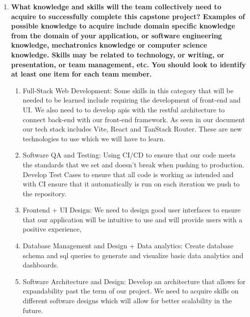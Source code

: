 \begin{enumerate}
  \item \textbf{What knowledge and skills will the team collectively need to acquire to successfully complete this capstone project?  Examples of possible knowledge to acquire include domain specific knowledge from the domain of your application, or software engineering knowledge, mechatronics knowledge or computer science knowledge.  Skills may be related to technology, or writing, or presentation, or team management, etc. You should look to identify at least one item for each team member.} \\
  \begin{enumerate}
    \item Full-Stack Web Development: Some skills in this category that will be needed to be learned include requiring the development of front-end and UI. We also need to to develop apis with the restful architecture to connect back-end with our front-end framework. As seen in our document our tech stack includes Vite, React and TanStack Router. These are new technologies to use which we will have to learn.
    \item Software QA and Testing: Using CI/CD to ensure that our code meets the standards that we set and doesn't break when pushing to production. Develop Test Cases to ensure that all code is working as intended and with CI ensure that it automatically is run on each iteration we push to the repository.
    \item Frontend + UI Design: We need to design good user interfaces to ensure that our application will be intuitive to use and will provide users with a positive experience,
    \item Database Management and Design + Data analytics: Create database schema and sql queries to generate and visualize basic data analytics and dashboards.
    \item Software Architecture and Design: Develop an architecture that allows for expandability past the term of our project. We need to acquire skills on different software designs which will allow for better scalability in the future.
    

\end{enumerate}
\end{enumerate}

